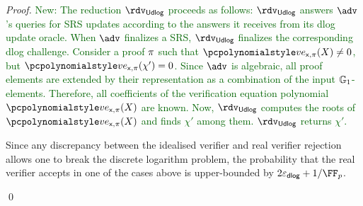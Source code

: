 \begin{proof}
  \textcolor{darkgreen}{New: The reduction $\rdvdulog$ proceeds as follows: $\rdvdulog$ answers $\adv$'s queries for SRS updates according to the answers it receives from its dlog update oracle. When $\adv$ finalizes a SRS, $\rdvdulog$ finalizes the corresponding dlog challenge. 
  	Consider a proof $\pi$ such
  	that $\vereq_{\inp, \zkproof}(X) \neq 0$, but
  	$\vereq_{\inp, \zkproof}(\chi') = 0$. Since $\adv$ is algebraic, all proof
  	elements are extended by their representation as a
  	combination of the input $\mathbb{G}_1$-elements. Therefore, all coefficients of the
  	verification equation polynomial $\vereq_{\inp, \zkproof}(X)$ are known.
  	Now, $\rdvdulog$ computes the roots of $\vereq_{\inp, \zkproof}(X)$ and finds $\chi'$ among
  	them. $\rdvdulog$ returns $\chi'$.}
  
  Since any discrepancy
  between the idealised verifier and real verifier rejection allows
  one to break the discrete logarithm problem, the probability that the real
  verifier accepts in one of the cases above is upper-bounded by
  $2 \epsdlog + \infrac{1}{\FF_p}$.

    \qed
\end{proof}

